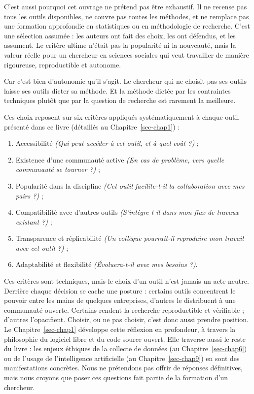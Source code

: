 \documentclass[
  letterpaper,
  DIV=11,
  numbers=noendperiod,
  oneside]{scrreprt}
\providecommand{\tightlist}{%
  \setlength{\itemsep}{0pt}\setlength{\parskip}{0pt}}\usepackage{longtable,booktabs,array}
\begin{document}
C'est aussi pourquoi cet ouvrage ne prétend pas être exhaustif. Il ne
recense pas tous les outils disponibles, ne couvre pas toutes les
méthodes, et ne remplace pas une formation approfondie en statistiques
ou en méthodologie de recherche. C'est une sélection assumée : les
auteurs ont fait des choix, les ont défendus, et les assument. Le
critère ultime n'était pas la popularité ni la nouveauté, mais la valeur
réelle pour un chercheur en sciences sociales qui veut travailler de
manière rigoureuse, reproductible et autonome.

Car c'est bien d'autonomie qu'il s'agit. Le chercheur qui ne choisit pas
ses outils laisse ses outils dicter sa méthode. Et la méthode dictée par
les contraintes techniques plutôt que par la question de recherche est
rarement la meilleure.

Ces choix reposent sur six critères appliqués systématiquement à chaque
outil présenté dans ce livre (détaillés au Chapitre~\ref{sec-chap1}) :

\begin{enumerate}
\def\labelenumi{\arabic{enumi}.}
\tightlist
\item
  Accessibilité \emph{(Qui peut accéder à cet outil, et à quel coût ?)}
  ;
\item
  Existence d'une communauté active \emph{(En cas de problème, vers
  quelle communauté se tourner ?)} ;
\item
  Popularité dans la discipline \emph{(Cet outil facilite-t-il la
  collaboration avec mes pairs ?)} ;
\item
  Compatibilité avec d'autres outils \emph{(S'intègre-t-il dans mon flux
  de travaux existant ?)} ;
\item
  Transparence et réplicabilité \emph{(Un collègue pourrait-il
  reproduire mon travail avec cet outil ?)} ;
\item
  Adaptabilité et flexibilité \emph{(Évoluera-t-il avec mes besoins ?)}.
\end{enumerate}

Ces critères sont techniques, mais le choix d'un outil n'est jamais un
acte neutre. Derrière chaque décision se cache une posture : certains
outils concentrent le pouvoir entre les mains de quelques entreprises,
d'autres le distribuent à une communauté ouverte. Certains rendent la
recherche reproductible et vérifiable ; d'autres l'opacifient. Choisir,
ou ne pas choisir, c'est donc aussi prendre position. Le
Chapitre~\ref{sec-chap1} développe cette réflexion en profondeur, à
travers la philosophie du logiciel libre et du code source ouvert. Elle
traverse aussi le reste du livre : les enjeux éthiques de la collecte de
données (au Chapitre~\ref{sec-chap6}) ou de l'usage de l'intelligence
artificielle (au Chapitre~\ref{sec-chap9}) en sont des manifestations
concrètes. Nous ne prétendons pas offrir de réponses définitives, mais
nous croyons que poser ces questions fait partie de la formation d'un
chercheur.
\end{document}

